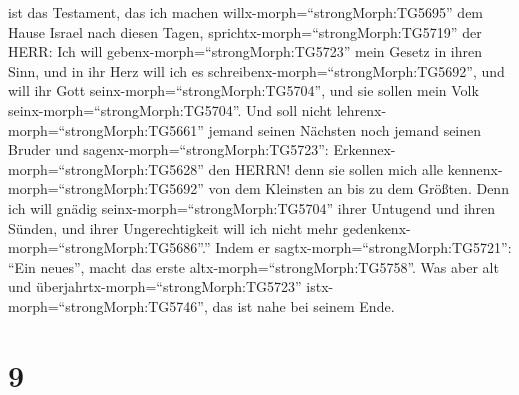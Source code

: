 ist das Testament, das ich machen willx-morph=``strongMorph:TG5695'' dem
Hause Israel nach diesen Tagen, sprichtx-morph=``strongMorph:TG5719''
der HERR: Ich will gebenx-morph=``strongMorph:TG5723'' mein Gesetz in
ihren Sinn, und in ihr Herz will ich es
schreibenx-morph=``strongMorph:TG5692'', und will ihr Gott
seinx-morph=``strongMorph:TG5704'', und sie sollen mein Volk
seinx-morph=``strongMorph:TG5704''.  Und soll nicht
lehrenx-morph=``strongMorph:TG5661'' jemand seinen Nächsten noch jemand
seinen Bruder und sagenx-morph=``strongMorph:TG5723'':
Erkennex-morph=``strongMorph:TG5628'' den HERRN! denn sie sollen mich
alle kennenx-morph=``strongMorph:TG5692'' von dem Kleinsten an bis zu
dem Größten.  Denn ich will gnädig
seinx-morph=``strongMorph:TG5704'' ihrer Untugend und ihren Sünden, und
ihrer Ungerechtigkeit will ich nicht mehr
gedenkenx-morph=``strongMorph:TG5686''.''  Indem er
sagtx-morph=``strongMorph:TG5721'': ``Ein neues'', macht das erste
altx-morph=``strongMorph:TG5758''. Was aber alt und
überjahrtx-morph=``strongMorph:TG5723''
istx-morph=``strongMorph:TG5746'', das ist nahe bei seinem Ende.

\hypertarget{section-8}{%
\section{9}\label{section-8}}

